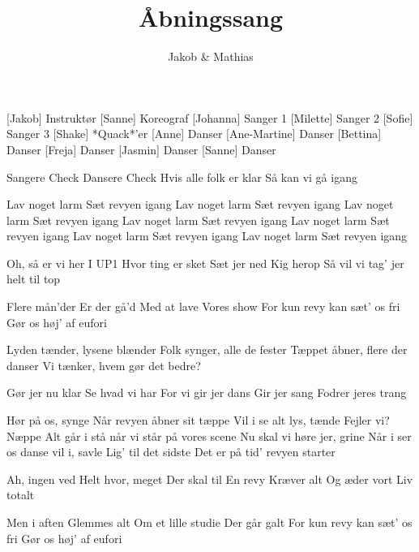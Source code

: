 \documentclass[a4paper,11pt]{article}
\title{Åbningssang}
\author{Jakob \& Mathias}
\begin{document}
\maketitle

\begin{roles}
[Jakob] Instruktør
[Sanne] Koreograf
[Johanna] Sanger 1
[Milette] Sanger 2
[Sofie] Sanger 3
[Shake] *Quack*'er
[Anne] Danser
[Ane-Martine] Danser
[Bettina] Danser
[Freja] Danser
[Jasmin] Danser
[Sanne] Danser
\end{roles}

\begin{song}

Sangere 
 Check
 Dansere 
 Check
Hvis alle folk er klar
Så kan vi gå igang

Lav noget larm
Sæt revyen igang
Lav noget larm
Sæt revyen igang
Lav noget larm
Sæt revyen igang
Lav noget larm
Sæt revyen igang
Lav noget larm
Sæt revyen igang
Lav noget larm
Sæt revyen igang
Lav noget larm 
Sæt revyen igang


 Oh, så er vi her
I UP1
Hvor ting er sket
Sæt jer ned
Kig herop
Så vil vi tag' jer helt til top

 Flere mån'der 
 Er der gå'd
 Med at lave 
 Vores show
For kun revy kan sæt' os fri
 Gør os høj' af eufori


 Lyden tænder, lysene blænder
Folk synger, alle de fester
Tæppet åbner, flere der danser                                   
Vi tænker, hvem gør det bedre?


Gør jer nu klar
Se hvad vi har
 For vi gir jer dans
 Gir jer sang
 Fodrer jeres 
 trang


 Hør på os, synge
Når revyen åbner sit tæppe
Vil i se alt lys, tænde
Fejler vi? Næppe
Alt går i stå når vi står på vores scene
Nu skal vi høre jer, grine
Når i ser os danse vil i, savle
Lig' til det sidste
Det er på tid' revyen starter


Ah, 
 ingen ved
 Helt hvor, meget
 Der skal til
En revy
Kræver alt
Og æder vort
 Liv totalt


 Men i aften 
 Glemmes alt
 Om et lille studie 
 Der går galt
 For kun revy kan sæt' os fri
  Gør os høj' af eufori



\end{song}
\end{document}
